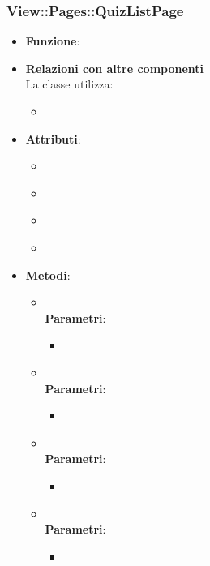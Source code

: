 \subsubsection{View::Pages::QuizListPage}
\begin{itemize}
\item\textbf{Funzione}:
\item\textbf{Relazioni con altre componenti}\\
La classe utilizza:
	\begin{itemize}
		\item
	\end{itemize}
\item\textbf{Attributi}:
	\begin{itemize}
		\item\code{}\\
		\item\code{}\\
		\item\code{}\\
		\item\code{}\\
	\end{itemize}
\item\textbf{Metodi}:
	\begin{itemize}
		\item\code{}\\
		\textbf{Parametri}:
			\begin{itemize}
				\item\code{}\\
			\end{itemize}
		\item\code{}\\
		\textbf{Parametri}:
			\begin{itemize}
				\item\code{}\\
			\end{itemize}
		\item\code{}\\
		\textbf{Parametri}:
			\begin{itemize}
				\item\code{}\\
			\end{itemize}
		\item\code{}\\
		\textbf{Parametri}:
			\begin{itemize}
				\item\code{}\\
			\end{itemize}
	\end{itemize}
\end{itemize}

